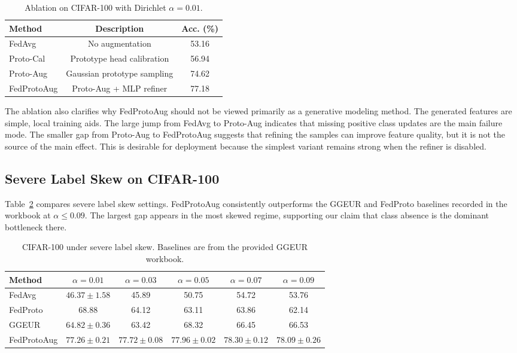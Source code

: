 ﻿\documentclass[runningheads]{llncs}
\newcommand{\method}{FedProtoAug}
\begin{document}
\begin{table}[t]
\centering
\caption{Ablation on CIFAR-100 with Dirichlet $\alpha=0.01$.}
\label{tab:ablation}
\begin{tabular}{lcc}
\toprule
Method & Description & Acc. (\%) \\
\midrule
FedAvg & No augmentation & 53.16 \\
Proto-Cal & Prototype head calibration & 56.94 \\
Proto-Aug & Gaussian prototype sampling & 74.62 \\
\method{} & Proto-Aug + MLP refiner & 77.18 \\
\bottomrule
\end{tabular}
\end{table}

The ablation also clarifies why \method{} should not be viewed primarily as a generative modeling method. The generated features are simple, local training aids. The large jump from FedAvg to Proto-Aug indicates that missing positive class updates are the main failure mode. The smaller gap from Proto-Aug to \method{} suggests that refining the samples can improve feature quality, but it is not the source of the main effect. This is desirable for deployment because the simplest variant remains strong when the refiner is disabled.

\subsection{Severe Label Skew on CIFAR-100}
Table~\ref{tab:cifar100_severe} compares severe label skew settings. \method{} consistently outperforms the GGEUR and FedProto baselines recorded in the workbook at $\alpha\le0.09$. The largest gap appears in the most skewed regime, supporting our claim that class absence is the dominant bottleneck there.

\begin{table}[t]
\centering
\caption{CIFAR-100 under severe label skew. Baselines are from the provided GGEUR workbook.}
\label{tab:cifar100_severe}
\begin{tabular}{lccccc}
\toprule
Method & $\alpha=0.01$ & $\alpha=0.03$ & $\alpha=0.05$ & $\alpha=0.07$ & $\alpha=0.09$ \\
\midrule
FedAvg & $46.37\pm1.58$ & 45.89 & 50.75 & 54.72 & 53.76 \\
FedProto & 68.88 & 64.12 & 63.11 & 63.86 & 62.14 \\
GGEUR & $64.82\pm0.36$ & 63.42 & 68.32 & 66.45 & 66.53 \\
\method{} & $77.26\pm0.21$ & $77.72\pm0.08$ & $77.96\pm0.02$ & $78.30\pm0.12$ & $78.09\pm0.26$ \\
\bottomrule
\end{tabular}
\end{table}
\end{document}
